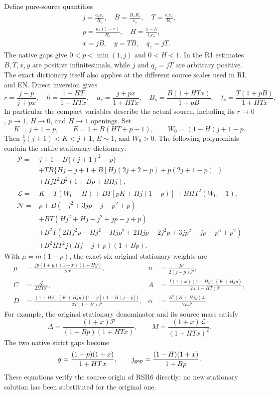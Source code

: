 Define pure-source quantities
\[
\begin{gathered}
 j=\frac{a_sc_s}{R_s},\quad B=\frac{B_sR_s}{c_s},\quad
 T=\frac{t_sc_s}{R_s},\\
 p=\frac{a_s(1-r)}{R_s},\quad H=\frac{1-h}{t_sc_s},\\
 x=jB,\quad y=TB,\quad q_z=jT .
\end{gathered}
 \tag{RSR2}
\]
The native gaps give $0<p<\min(1,j)$ and $0<H<1$.
In the R1 estimates $B,T,x,y$ are positive infinitesimals, while
$j$ and $q_z=jT$ are arbitrary positive. The exact dictionary itself
also applies at the different source scales used in RL and EN. Direct inversion gives
\[
 r=\frac{j-p}{j+px},\quad h=\frac{1-HT}{1+HTx},\quad
 a_s=\frac{j+px}{1+HTx},\quad
 B_s=\frac{B(1+HTx)}{1+pB},\quad
 t_s=\frac{T(1+pB)}{1+HTx}.
 \tag{RSR3}
\]
In particular the compact variables describe the actual source,
including its $r\to0$, $p\to1$, $H\to0$, and $H\to1$ openings.
Set
\[
 K=j+1-p,\qquad E=1+B(HT+p-1),\qquad
 W_0=(1-H)j+1-p.
 \tag{RSR4}
\]
Then $\tfrac12(j+1)<K<j+1$, $E\sim1$, and $W_0>0$.
The following polynomials contain the entire stationary dictionary:
\begin{align*}
\mathcal P={}&j+1+B\{(j+1)^2-p\}\\
 &+TB\{Hj+j+1+B[Hj(2j+2-p)+p(2j+1-p)]\}\\
 &+HjT^2B^2(1+Bp+BHj),\\
\mathcal L={}&K+T(W_0-H)+BT[pK+Hj(1-p)]+BHT^2(W_0-1),\\
\mathcal N={}&p+B(-j^2+3jp-j-p^2+p)\\
 &+BT(Hj^2+Hj-j^2+jp-j+p)\\
 &+B^2T(2Hj^2p-Hj^2-Hjp^2+2Hjp
             -2j^2p+3jp^2-jp-p^3+p^2)\\
 &+B^2HT^2j(Hj-j+p)(1+Bp).
 \tag{RSR5}
\end{align*}
With $\mu=m(1-p)$, the exact six original stationary weights are
\[
\begin{aligned}
 \mu&=\frac{jp(1+y)(1+x)(1+Hy)}{2\mathcal P},&
 n&=\frac{\mathcal N}{2(j-p)\mathcal P},\\
 C&=\frac{\mathcal L}{2HT\mathcal P},&
 A&=\frac{T(1+x)(1+Hy)(K+Hjy)}{2(1-HT)\mathcal P},\\
 D&=\frac{(1+Hy)(K+Hjy)\{1-y[(1-H)j-p]\}}
             {2T(1-H)\mathcal P},&
 \alpha&=\frac{B^2(K+Hjy)\mathcal L}{2E\mathcal P}.
\end{aligned}
 \tag{RSR6}
\]
For example, the original stationary denominator and its source mass
satisfy
\[
 \Delta=\frac{(1+x)\mathcal P}{(1+Bp)(1+HTx)},\qquad
 M=\frac{(1+x)\mathcal L}{(1+HTx)^2}.
\]
The two native strict gaps become
\[
 g=\frac{(1-p)(1+x)}{1+HTx},\qquad
 j_{\rm gap}=\frac{(1-H)(1+x)}{1+Bp}.
\]
These equations verify the source origin of RSR6 directly; no new
stationary solution has been substituted for the original one.


